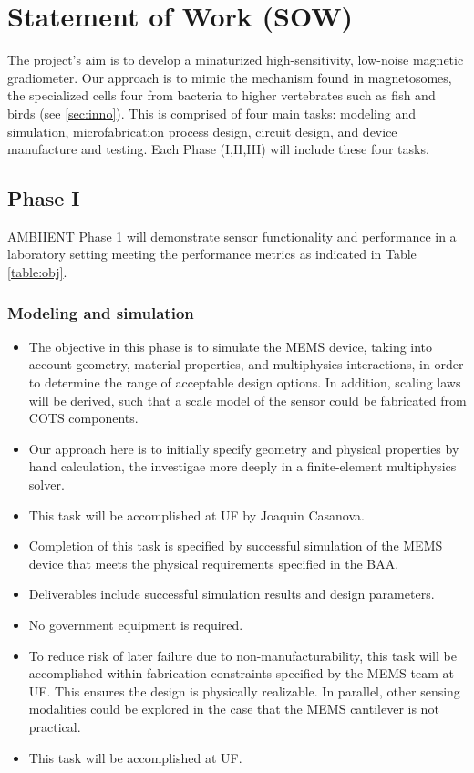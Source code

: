 
\section{Statement of Work (SOW)}
The project's aim is to develop a minaturized high-sensitivity, low-noise magnetic gradiometer. Our approach is to mimic the mechanism found in magnetosomes, the specialized cells four from bacteria to higher vertebrates such as fish and birds (see \ref{sec:inno}). This is comprised of four main tasks: modeling and simulation, microfabrication process design, circuit design, and device manufacture and testing. Each Phase (I,II,III) will include these four tasks.

\subsection{Phase I}

AMBIIENT Phase 1 will demonstrate sensor functionality and performance in a laboratory
setting meeting the performance metrics as indicated in Table \ref{table:obj}. 

\subsubsection{Modeling and simulation}\label{sec:p1:em}
\begin{itemize}
\item The objective in this phase is to simulate the MEMS device, taking into account geometry, material properties, and multiphysics interactions, in order to determine the range of acceptable design options. In addition, scaling laws will be derived, such that a scale model of the sensor could be fabricated from COTS components.
\item Our approach here is to initially specify geometry and physical properties by hand calculation, the investigae more deeply in a finite-element multiphysics solver.
\item This task will be accomplished at UF by Joaquin Casanova.
\item Completion of this task is specified by successful simulation of the MEMS device that meets the physical requirements specified in the BAA.
\item Deliverables include successful simulation results and design parameters.
\item No government equipment is required.
\item To reduce risk of later failure due to non-manufacturability, this task will be accomplished within fabrication constraints specified by the MEMS team at UF. This ensures the design is physically realizable. In parallel, other sensing modalities could be explored in the case that the MEMS cantilever is not practical.
\item This task will be accomplished at UF.
\end{itemize}
